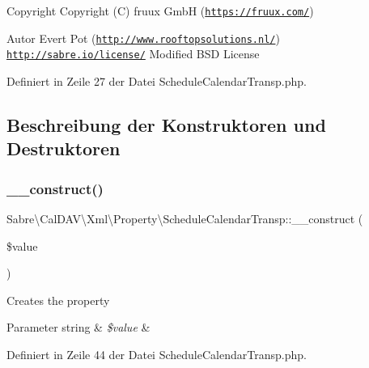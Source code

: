 \begin{DoxyCopyright}{Copyright}
Copyright (C) fruux GmbH (\href{https://fruux.com/}{\tt https\+://fruux.\+com/}) 
\end{DoxyCopyright}
\begin{DoxyAuthor}{Autor}
Evert Pot (\href{http://www.rooftopsolutions.nl/}{\tt http\+://www.\+rooftopsolutions.\+nl/})  \href{http://sabre.io/license/}{\tt http\+://sabre.\+io/license/} Modified B\+SD License 
\end{DoxyAuthor}


Definiert in Zeile 27 der Datei Schedule\+Calendar\+Transp.\+php.



\subsection{Beschreibung der Konstruktoren und Destruktoren}
\mbox{\label{class_sabre_1_1_cal_d_a_v_1_1_xml_1_1_property_1_1_schedule_calendar_transp_ab5560d0cb480354914ba35b0ed80d171}} 
\subsubsection{\texorpdfstring{\+\_\+\+\_\+construct()}{\_\_construct()}}
{\footnotesize\ttfamily Sabre\textbackslash{}\+Cal\+D\+A\+V\textbackslash{}\+Xml\textbackslash{}\+Property\textbackslash{}\+Schedule\+Calendar\+Transp\+::\+\_\+\+\_\+construct (\begin{DoxyParamCaption}\item[{}]{\$value }\end{DoxyParamCaption})}

Creates the property


\begin{DoxyParams}[1]{Parameter}
string & {\em \$value} & \\
\hline
\end{DoxyParams}


Definiert in Zeile 44 der Datei Schedule\+Calendar\+Transp.\+php.



